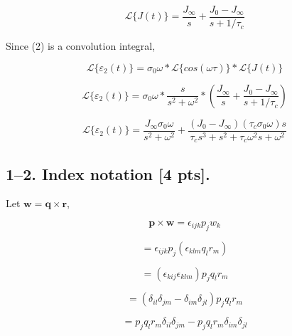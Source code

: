 \documentclass{article}
\begin{document}
\begin{equation*}
    \mathcal{L}\{J(t)\} = \frac{J_\infty}{s} + \frac{J_0-J_\infty}{s+1/\tau_c}
\end{equation*}

\bigskip

Since (2) is a convolution integral,

\begin{equation*}
    \mathcal{L}\{\varepsilon_2(t)\} = \sigma_0\omega*\mathcal{L}\{cos(\omega\tau)\}*\mathcal{L}\{J(t)\}
\end{equation*}

\begin{equation*}
    \mathcal{L}\{\varepsilon_2(t)\} = \sigma_0\omega*\frac{s}{s^2+\omega^2}*(\frac{J_\infty}{s} + \frac{J_0-J_\infty}{s+1/\tau_c})
\end{equation*}

\begin{equation*}
    \mathcal{L}\{\varepsilon_2(t)\} = \frac{J_\infty\sigma_0\omega}{s^2+\omega^2} + \frac{(J_0-J_\infty)(\tau_c\sigma_0\omega)s}{\tau_c s^3+s^2+\tau_c\omega^2 s+\omega^2}
\end{equation*}

\newpage


\subsection*{1--2. \textbf{Index notation} [4 pts].}

Let $\bm{w}=\bm{q} \times \bm{r}$,

\begin{equation*}
    \bm{p} \times \bm{w} = \epsilon_{ijk} p_j w_k
\end{equation*}

\begin{equation*}
    = \epsilon_{ijk} p_j (\epsilon_{klm} q_l r_m)
\end{equation*}

\begin{equation*}
    = (\epsilon_{kij} \epsilon_{klm}) p_j q_l r_m
\end{equation*}

\begin{equation*}
    = (\delta_{il} \delta_{jm} - \delta_{im} \delta_{jl}) p_j q_l r_m
\end{equation*}

\begin{equation*}
    = p_j q_l r_m \delta_{il} \delta_{jm} - p_j q_l r_m \delta_{im} \delta_{jl}
\end{equation*}
\end{document}

